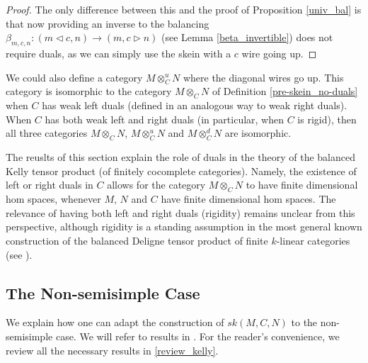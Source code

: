 \begin{proof}
  The only difference between this and the proof of Proposition \ref{univ_bal}
  is that now providing an inverse to the balancing $\beta_{m,c,n}:(m\lhd c,
  n)\to (m,c\rhd n)$ (see Lemma \ref{beta_invertible}) does not require duals,
  as we can simply use the skein with a $c$ wire going up.
\end{proof}
  
\begin{remark}
  We could also define a category $M\otimes_C^u N$ where the diagonal wires go
  up. This category is isomorphic to the category $M\otimes_C N$ of Definition
  \ref{pre-skein_no-duals} when $C$ has weak left duals (defined in an
  analogous way to weak right duals). When $C$ has both weak left and right
  duals (in particular, when $C$ is rigid), then all three categories
  $M\otimes_C N$, $M\otimes^u_C N$ and $M\otimes_C^d N$ are isomorphic.
\end{remark}

\begin{remark}
The reuslts of this section explain the role of duals in the theory
of the balanced Kelly tensor product (of finitely cocomplete categories).
Namely, the existence of left or right duals in $C$ allows for the category 
$M\otimes_C N$ to have finite dimensional hom spaces, whenever $M$, $N$ and 
$C$ have finite dimensional hom spaces. The relevance of having both left and 
right duals (rigidity) remains unclear from this perspective, although rigidity 
is a standing assumption in the most general known
construction of the balanced Deligne tensor product of finite $k$-linear categories 
(see \cite{douglas/balanced-product}).\end{remark}

\subsection{The Non-semisimple Case} \label{section-nonsemisimple}



We explain how one can adapt the construction of $sk(M,C,N)$ to the
non-semisimple case. We will refer to results in
\cite{kelly/basic-concepts-enriched}. For the reader's convenience, we review
all the necessary results in \ref{review_kelly}.

